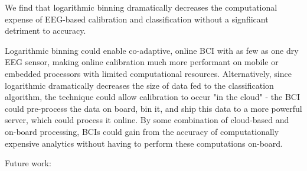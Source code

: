 We find that logarithmic binning dramatically decreases the computational expense of EEG-based calibration and classification without a signfiicant detriment to accuracy. 

Logarithmic binning could enable co-adaptive, online BCI with as few as one dry EEG sensor, making online calibration much more performant on mobile or embedded processors with limited computational resources. Alternatively, since logarithmic dramatically decreases the size of data fed to the classification algorithm, the technique could allow calibration to occur "in the cloud" - the BCI could pre-process the data on board, bin it, and ship this data to a more powerful server, which could process it online. By some combination of cloud-based and on-board processing, BCIs could gain from the accuracy of computationally expensive analytics without having to perform these computations on-board.


Future work:
